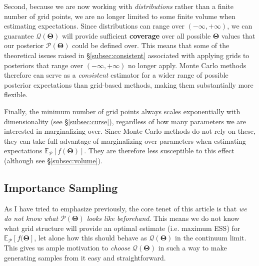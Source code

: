 \documentclass[12pt, titlepage]{article}
\newcommand{\meanwrt}[2]{\ensuremath{\mathbb{E}_{{#2}}\left[{#1}\right]}}
\newcommand{\params}{\ensuremath{\boldsymbol\Theta}}
\newcommand{\posterior}{\ensuremath{\mathcal{P}}}
\newcommand{\proposal}{\ensuremath{\mathcal{Q}}}
\begin{document}
Second, because we are now working with \textit{distributions}
rather than a finite number of grid points, we are no longer limited
to some finite volume when estimating expectations. Since distributions can
range over $(-\infty, +\infty)$, we can guarantee $\proposal(\params)$
will provide sufficient \textbf{coverage} over all possible $\params$ 
values that our posterior $\posterior(\params)$ could be defined over.
This means that some of the theoretical issues raised in \S\ref{subsec:consistent}
associated with applying grids to posteriors 
that range over $(-\infty, +\infty)$ no longer apply. 
Monte Carlo methods therefore can serve as a \textit{consistent}
estimator for a wider range of possible posterior expectations
than grid-based methods, making them substantially more flexible.

Finally, the minimum number of grid points always scales exponentially
with dimensionality (see \S\ref{subsec:curse}), regardless of how many 
parameters we are interested in marginalizing over. Since 
Monte Carlo methods do not rely on these, they can take full
advantage of marginalizing over parameters 
when estimating expectations $\meanwrt{f(\params)}{\posterior}$. 
They are therefore less susceptible to this effect 
(although see \S\ref{subsec:volume}).

\subsection{Importance Sampling} \label{subsec:importance}

As I have tried to emphasize previously, the core tenet of this article is that
\textit{we do not know what $\posterior(\params)$ looks like beforehand}.
This means we do not know what grid structure will
provide an optimal estimate (i.e. maximum ESS) for
$\meanwrt{f(\params}{\posterior}$, let alone how this should
behave as $\proposal(\params)$ in the continuum limit. This gives
us ample motivation to \textit{choose} $\proposal(\params)$
in such a way to make generating samples from it easy and straightforward.
\end{document}
